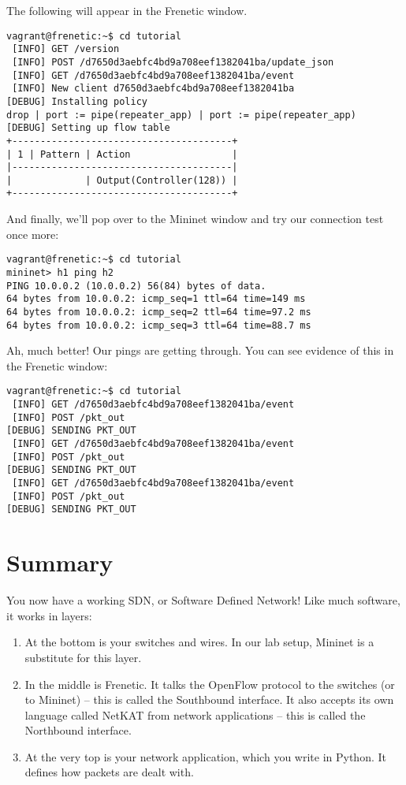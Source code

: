 The following will appear in the Frenetic window.  
\\
\begin{lstlisting}[style=BashInputStyle]vagrant@frenetic:~$ cd tutorial
 [INFO] GET /version
 [INFO] POST /d7650d3aebfc4bd9a708eef1382041ba/update_json
 [INFO] GET /d7650d3aebfc4bd9a708eef1382041ba/event
 [INFO] New client d7650d3aebfc4bd9a708eef1382041ba
[DEBUG] Installing policy
drop | port := pipe(repeater_app) | port := pipe(repeater_app)
[DEBUG] Setting up flow table
+---------------------------------------+
| 1 | Pattern | Action                  |
|---------------------------------------|
|             | Output(Controller(128)) |
+---------------------------------------+
\end{lstlisting}

And finally, we'll pop over to the Mininet window and try our connection test once more:
\\
\begin{lstlisting}[style=BashInputStyle]
vagrant@frenetic:~$ cd tutorial
mininet> h1 ping h2
PING 10.0.0.2 (10.0.0.2) 56(84) bytes of data.
64 bytes from 10.0.0.2: icmp_seq=1 ttl=64 time=149 ms
64 bytes from 10.0.0.2: icmp_seq=2 ttl=64 time=97.2 ms
64 bytes from 10.0.0.2: icmp_seq=3 ttl=64 time=88.7 ms
\end{lstlisting}

Ah, much better! 
Our pings are getting through.  
You can see evidence of this in the Frenetic window:
\\
\begin{lstlisting}[style=BashInputStyle]
vagrant@frenetic:~$ cd tutorial
 [INFO] GET /d7650d3aebfc4bd9a708eef1382041ba/event
 [INFO] POST /pkt_out
[DEBUG] SENDING PKT_OUT
 [INFO] GET /d7650d3aebfc4bd9a708eef1382041ba/event
 [INFO] POST /pkt_out
[DEBUG] SENDING PKT_OUT
 [INFO] GET /d7650d3aebfc4bd9a708eef1382041ba/event
 [INFO] POST /pkt_out
[DEBUG] SENDING PKT_OUT
\end{lstlisting}

\section{Summary}

You now have a working SDN, or Software Defined Network!   Like much software, it works in layers:

\begin{enumerate}
\item At the bottom is your switches and wires.  In our lab setup, Mininet is a substitute for this layer.
\item In the middle is Frenetic.  It talks the OpenFlow protocol to the switches (or to Mininet) -- this is called the Southbound interface.  It also accepts its own language called NetKAT from network applications -- this is called the Northbound interface.
\item At the very top is your network application, which you write in Python.  It defines how packets are dealt with.
\end{enumerate}

